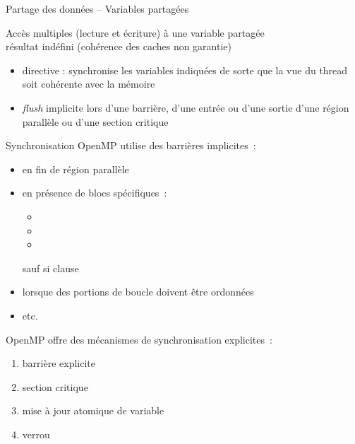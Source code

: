\begin {frame} {Partage des données -- Variables partagées}

    Accès multiples (lecture et écriture) à une variable partagée \\
    \implique résultat indéfini (cohérence des caches non garantie)

    \vspace* {3mm}

    \begin {itemize}
	\item directive  : synchronise
	    les variables indiquées de sorte que la vue du thread soit
	    cohérente avec la mémoire

	\item \emph {flush} implicite lors d'une barrière, d'une
	    entrée ou d'une sortie d'une région parallèle ou d'une
	    section critique

    \end {itemize}




\end{frame}



\begin {frame} {Synchronisation}
    OpenMP utilise des barrières implicites~:
    \begin {itemize}
	\item en fin de région parallèle
	\item en présence de blocs spécifiques~:
	    \begin {itemize}
		\item {}
		\item {}
		\item {}
	    \end {itemize}
	    \implique sauf si clause 
	\item lorsque des portions de boucle doivent être ordonnées
	\item etc.
    \end {itemize}

    OpenMP offre des mécanismes de synchronisation explicites~:
    \begin {enumerate}
	\item barrière explicite
	\item section critique
	\item mise à jour atomique de variable
	\item verrou
    \end {enumerate}
\end {frame}

